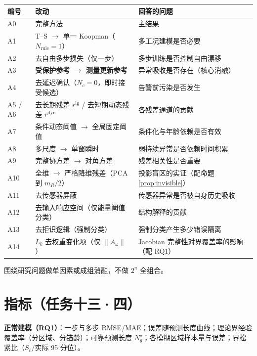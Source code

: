 \documentclass[11pt,a4paper]{ctexart}
\theoremstyle{remark}
\begin{document}
\begin{center}
\small
\begin{tabular}{L{0.09\textwidth}L{0.29\textwidth}L{0.46\textwidth}}
\toprule
编号 & 改动 & 回答的问题 \\
\midrule
A0 & 完整方法 & 主结果 \\
A1 & T--S $\to$ 单一 Koopman（$N_{\mathrm{rule}}=1$） & 多工况建模是否必要 \\
A2 & 去自由多步损失（仅一步） & 多步训练是否控制自由漂移 \\
A3 & \textbf{受保护参考 $\to$ 测量更新参考} & 异常吸收是否存在（核心消融） \\
A4 & 去延迟确认（$N_c=0$，即时接受候选） & 告警前污染是否发生 \\
A5 / A6 & 去长期残差 $r^{\mathrm{lg}}$ / 去短期动态残差 $r^{\mathrm{dyn}}$ & 各残差通道的贡献 \\
A7 & 条件动态阈值 $\to$ 全局固定阈值 & 条件化与年龄依赖是否有效 \\
A8 & 多尺度 $\to$ 单窗瞬时 & 弱持续异常是否依赖时间积累 \\
A9 & 完整协方差 $\to$ 对角方差 & 残差相关性是否重要 \\
A10 & 全维 $\to$ 严格降维残差（PCA 到 $m_R/2$） & 投影盲区的实证（配命题 \ref{prop:invisible}） \\
A11 & 去传感器屏蔽 & 传感器异常是否被自身历史吸收 \\
A12 & 去输入响应空间（仅能量阈值分类） & 结构解释的贡献 \\
A13 & 去拒识逻辑（强制分类） & 强制分类产生多少错误隔离 \\
A14 & $L_k$ 去权重变化项（仅 $\|A_\omega\|$） & Jacobian 完整性对界覆盖率的影响（配 RQ1） \\
\bottomrule
\end{tabular}
\end{center}

围绕研究问题做单因素或成组消融，不做 $2^n$ 全组合。

\section{指标（任务十三·四）}

\textbf{正常建模（RQ1）}：一步与多步 RMSE/MAE；误差随预测长度曲线；理论界经验覆盖率（分区域、分锚龄）；可靠预测长度 $N^\star_g$；各模糊区域样本量与误差；界松紧比（$S_\ell/$实际 95 分位）。
\end{document}
